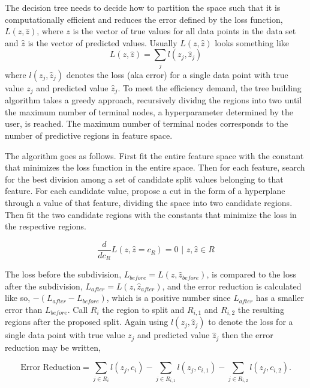 \documentclass[12pt]{article}
\begin{document}
The decision tree needs to decide how to partition the space such that it is computationally efficient and reduces the error defined by the loss function, $L(z,\hat{z})$, where $z$ is the vector of true values for all data points in the data set and $\hat{z}$ is the vector of predicted values. Usually $L(z,\hat{z})$ looks something like 
\begin{equation}
L(z,\hat{z}) = \sum_{j} l(z_j,\hat{z}_j)
\end{equation}
where $l(z_j,\hat{z}_j)$ denotes the loss (aka error) for a single data point with true value $z_j$ and predicted value $\hat{z}_j$. To meet the efficiency demand, the tree building algorithm takes a greedy approach, recursively dividng the regions into two until the maximum number of terminal nodes, a hyperparameter determined by the user, is reached. The maximum number of terminal nodes corresponds to the number of predictive regions in feature space. 

The algorithm goes as follows. First fit the entire feature space with the constant that minimizes the loss function in the entire space. Then for each feature, search for the best division among a set of candidate split values belonging to that feature. For each candidate value, propose a cut in the form of a hyperplane through a value of that feature, dividing the space into two candidate regions. Then fit the two candidate regions with the constants that minimize the loss in the respective regions. 

\begin{equation}
\frac{d}{dc_{R}} L(z,\hat{z} = c_{R}) = 0 \textrm{ | } z,\hat{z} \in R
\end{equation}

The loss before the subdivision, $L_{before} = L(z,\hat{z}_{before})$, is compared to the loss after the subdivision, $L_{after} = L(z,\hat{z}_{after})$, and the error reduction is calculated like so, $-(L_{after} - L_{before})$, which is a positive number since $L_{after}$ has a smaller error than $L_{before}$. Call $R_{i}$ the region to split and $R_{i,1}$ and $R_{i,2}$ the resulting regions after the proposed split. Again using $l(z_j,\hat{z}_j)$ to denote the loss for a single data point with true value $z_j$ and predicted value $\hat{z}_j$ then the error reduction may be written, 

\begin{equation}
\textrm{Error Reduction} = \sum_{j \in R_{i}} l(z_j,c_i) - \sum_{j \in R_{i,1}} l(z_j,c_{i,1}) - \sum_{j \in R_{i,2}} l(z_j,c_{i,2}).
\end{equation}
\end{document}
